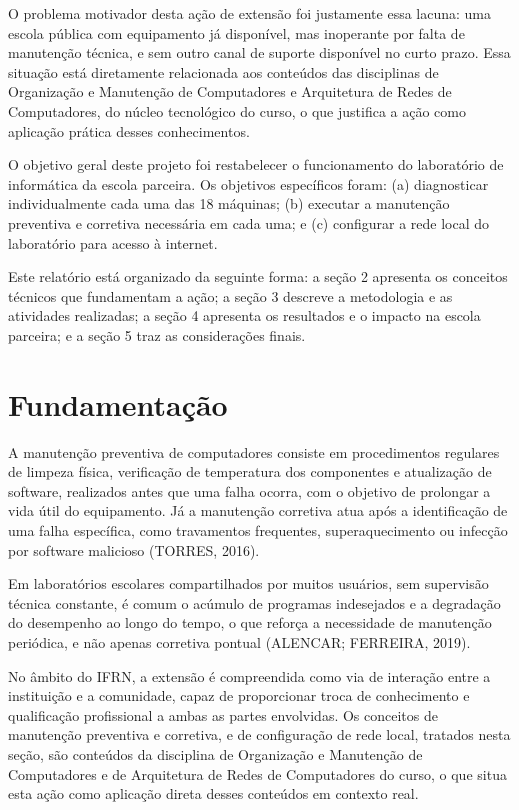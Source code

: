 \documentclass[article,12pt,a4paper]{abntex2}
\begin{document}
O problema motivador desta ação de extensão foi justamente essa lacuna:
uma escola pública com equipamento já disponível, mas inoperante por falta
de manutenção técnica, e sem outro canal de suporte disponível no curto
prazo. Essa situação está diretamente relacionada aos conteúdos das
disciplinas de Organização e Manutenção de Computadores e Arquitetura de
Redes de Computadores, do núcleo tecnológico do curso, o que justifica a
ação como aplicação prática desses conhecimentos.

O objetivo geral deste projeto foi restabelecer o funcionamento do
laboratório de informática da escola parceira. Os objetivos específicos
foram: (a) diagnosticar individualmente cada uma das 18 máquinas; (b)
executar a manutenção preventiva e corretiva necessária em cada uma; e (c)
configurar a rede local do laboratório para acesso à internet.

Este relatório está organizado da seguinte forma: a seção 2 apresenta os
conceitos técnicos que fundamentam a ação; a seção 3 descreve a
metodologia e as atividades realizadas; a seção 4 apresenta os resultados
e o impacto na escola parceira; e a seção 5 traz as considerações finais.

\section{Fundamentação}

A manutenção preventiva de computadores consiste em procedimentos
regulares de limpeza física, verificação de temperatura dos componentes e
atualização de software, realizados antes que uma falha ocorra, com o
objetivo de prolongar a vida útil do equipamento. Já a manutenção
corretiva atua após a identificação de uma falha específica, como
travamentos frequentes, superaquecimento ou infecção por software
malicioso (TORRES, 2016).

Em laboratórios escolares compartilhados por muitos usuários, sem
supervisão técnica constante, é comum o acúmulo de programas indesejados e
a degradação do desempenho ao longo do tempo, o que reforça a necessidade
de manutenção periódica, e não apenas corretiva pontual (ALENCAR;
FERREIRA, 2019).

No âmbito do IFRN, a extensão é compreendida como via de interação entre a
instituição e a comunidade, capaz de proporcionar troca de conhecimento e
qualificação profissional a ambas as partes envolvidas. Os conceitos de
manutenção preventiva e corretiva, e de configuração de rede local,
tratados nesta seção, são conteúdos da disciplina de Organização e
Manutenção de Computadores e de Arquitetura de Redes de Computadores do
curso, o que situa esta ação como aplicação direta desses conteúdos em
contexto real.
\end{document}
